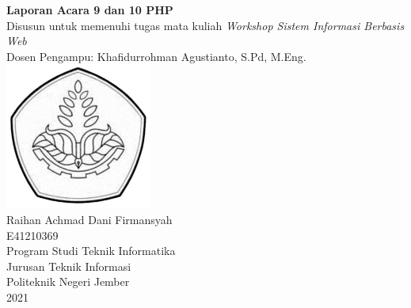 \documentclass[a4paper]{article}
\begin{document}
\begin{center}



  {\huge \bfseries Laporan Acara 9 dan 10 PHP}
  \\[0.7em]


  Disusun untuk memenuhi tugas mata kuliah {\it Workshop Sistem Informasi Berbasis Web}
  \\[0.3em]


  Dosen Pengampu: {Khafidurrohman Agustianto, S.Pd, M.Eng.}
  \\[5em]


  \includegraphics[width=13em]{figs/poliyeay-bw.png}
  \\[3em]


  {\large Raihan Achmad Dani Firmansyah}
  \\[0.7em]
  {\large E41210369}
  \\[13em]


  {\Large Program Studi Teknik Informatika}
    \\[0.7em]
  {\Large Jurusan Teknik Informasi}
    \\[0.7em]
  {\Large Politeknik Negeri Jember}
    \\[0.7em]
  {\Large 2021}

\end{center}

\end{document}
